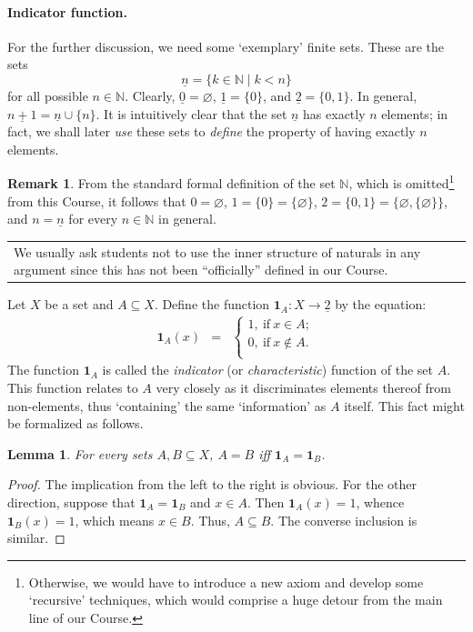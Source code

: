 \documentclass[12pt,notitlepage]{article}
\theoremstyle{plain}
\newtheorem{lemma}[thm]{Lemma}
\theoremstyle{definition}
\newtheorem{rem}[thm]{Remark}
\theoremstyle{plain}
\newcommand{\N}{\mathbb{N}}
\newcommand{\sbs}{\subseteq}
\newcommand{\void}{\varnothing}
\newcommand{\ul}[1]{\underline{#1}}
\newcommand{\1}{\mathbf{1}}
\newcommand{\0}{\mathbf{0}}
\newcommand{\mcomm}[1]{
\medskip\noindent\begin{tabular}{| l}
\parbox{0.99\textwidth}{{\small
#1 }}\end{tabular}
\smallskip}
\begin{document}
\paragraph{Indicator function.} For the further discussion, we need some `exemplary' finite sets. These are the sets
$$\ul{n} = \{ k \in \N \mid k < n \}$$
for all possible $n \in \N$. Clearly, $\ul{0} = \void$, $\ul{1} = \{0\}$, and $\ul{2} = \{0, 1\}$. In general, $\ul{n + 1} = \ul{n} \cup \{ n \}$. It is intuitively clear that the set $\ul{n}$ has exactly $n$ elements; in fact, we shall later \emph{use} these sets to \emph{define} the property of having exactly $n$ elements.

\begin{rem}
From the standard formal definition of the set $\N$, which is omitted\footnote{Otherwise, we would have to introduce a new axiom and develop some `recursive' techniques, which would comprise a huge detour from the main line of our Course.} from this Course, it follows that $0 = \void$, $1 = \{0\} = \{ \void \}$, $2 = \{0, 1\} = \{ \void, \{\void\} \}$, and $n = \ul{n}$ for every $n \in \N$ in general.
\end{rem}
\mcomm{We usually ask students not to use the inner structure of naturals in any argument since this has not been ``officially'' defined in our Course.}

Let $X$ be a set and $A \sbs X$. Define the function $\1_A \colon X \to \ul{2}$ by the equation:
$$
\begin{array}{rcl}
\1_A(x) &=& \begin{cases}
1,\ \mbox{if}\ x \in A;\\
0,\ \mbox{if}\ x \notin A.\\
\end{cases}
\end{array}
$$
The function $\1_A$ is called the \emph{indicator} (or \emph{characteristic}) function of the set $A$. This function relates to $A$ very closely as it discriminates elements thereof from non-elements, thus `containing' the same `information' as $A$ itself. This fact might be formalized as follows.
\begin{lemma}\label{L9:char1}
For every sets $A, B \sbs X$, $A = B$ iff $\1_A = \1_B$.
\end{lemma}
\begin{proof}
The implication from the left to the right is obvious. For the other direction, suppose that $\1_A = \1_B$ and $x \in A$. Then $\1_A(x) = 1$, whence $\1_B(x) = 1$, which means $x \in B$. Thus, $A \sbs B$. The converse inclusion is similar.
\end{proof}
\end{document}
